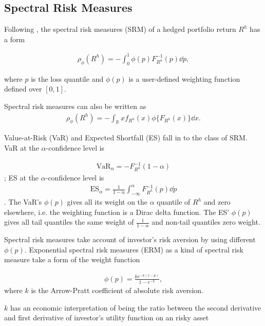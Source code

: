 \subsection{Spectral Risk Measures}\label{subsec:spectral-risk-measures}
Following \citet{dowd2008spectral}, the spectral risk measures (SRM) of a hedged portfolio return $R^h$ has a form

\begin{align}
	\rho_\phi(R^h) = - \int_0^1 \phi(p) F_{R^h}^{-1}(p)\dd p,
	\end{align}

where $p$ is the loss quantile and $\phi(p)$ is a user-defined weighting function defined over $[0,1]$. \medskip


Spectral risk measures can also be written as
\begin{align}
	\rho_\phi(R^h) = - \int_\mathbb{R} x f_{R^h}(x) \phi\{F_{R^h}(x)\} \dd x.
	\end{align}

Value-at-Risk (VaR) and Expected Shortfall (ES) fall in to the class of SRM.
VaR at the $\alpha$-confidence level is

\begin{align}
	\text{VaR}_\alpha = - F_{R^h}^{-1}(1-\alpha)
	\end{align};
ES at the $\alpha$-confidence level is 
\begin{align}
	\text{ES}_\alpha = \frac{1}{1-\alpha}\int_{-\infty}^{\alpha} F_{R^h}^{-1}(p) \dd p
	\end{align}.
The VaR's $\phi(p)$ gives all its weight on the $\alpha$ quantile of $R^h$ and zero elsewhere, i.e. the weighting function is a Dirac delta function.
The ES' $\phi(p)$ gives all tail quantiles the same weight of $\frac{1}{1-\alpha}$ and non-tail quantiles zero weight. \medskip

Spectral risk measures take account of investor's risk aversion by using different $\phi(p)$.
Exponential spectral risk measures (ERM) as a kind of spectral risk measure take a form of the weight function

\begin{align}
	\phi(p) =\frac{k e^{-k(1-p)}}{1-e^{-k}} ,
	\end{align}
where $k$ is the Arrow-Pratt coefficient of absolute risk aversion. \medskip

$k$ has an economic interpretation of being the ratio between the second derivative and first derivative
of investor's utility function on an risky asset

